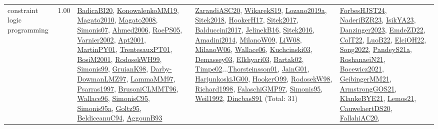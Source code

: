 {\begin{longtable}{p{3cm}r>{\raggedright\arraybackslash}p{6cm}>{\raggedright\arraybackslash}p{6cm}>{\raggedright\arraybackslash}p{8cm}}
\index{constraint logic programming}\index{CP!constraint logic programming}constraint logic programming &  1.00 & \hyperref[detail:BadicaBI20]{BadicaBI20}, \hyperref[detail:KonowalenkoMM19]{KonowalenkoMM19}, \hyperref[detail:Magato2010]{Magato2010}, \hyperref[detail:Magato2008]{Magato2008}, \hyperref[detail:Simonis07]{Simonis07}, \hyperref[detail:Ahmed2006]{Ahmed2006}, \hyperref[detail:RoePS05]{RoePS05}, \hyperref[detail:Varnier2002]{Varnier2002}, \hyperref[detail:Apt2001]{Apt2001}, \hyperref[detail:MartinPY01]{MartinPY01}, \hyperref[detail:TrentesauxPT01]{TrentesauxPT01}, \hyperref[detail:BosiM2001]{BosiM2001}, \hyperref[detail:RodosekWH99]{RodosekWH99}, \hyperref[detail:Simonis99]{Simonis99}, \hyperref[detail:GruianK98]{GruianK98}, \hyperref[detail:Darby-DowmanLMZ97]{Darby-DowmanLMZ97}, \hyperref[detail:LammaMM97]{LammaMM97}, \hyperref[detail:Psarras1997]{Psarras1997}, \hyperref[detail:BrusoniCLMMT96]{BrusoniCLMMT96}, \hyperref[detail:Wallace96]{Wallace96}, \hyperref[detail:SimonisC95]{SimonisC95}, \hyperref[detail:Simonis95a]{Simonis95a}, \hyperref[detail:Goltz95]{Goltz95}, \hyperref[detail:BeldiceanuC94]{BeldiceanuC94}, \hyperref[detail:AggounB93]{AggounB93} & \hyperref[detail:ZarandiASC20]{ZarandiASC20}, \hyperref[detail:WikarekS19]{WikarekS19}, \hyperref[detail:Lozano2019a]{Lozano2019a}, \hyperref[detail:Sitek2018]{Sitek2018}, \hyperref[detail:HookerH17]{HookerH17}, \hyperref[detail:Sitek2017]{Sitek2017}, \hyperref[detail:Balduccini2017]{Balduccini2017}, \hyperref[detail:JelinekB16]{JelinekB16}, \hyperref[detail:Sitek2016]{Sitek2016}, \hyperref[detail:Amadini2014]{Amadini2014}, \hyperref[detail:MilanoW09]{MilanoW09}, \hyperref[detail:LiW08]{LiW08}, \hyperref[detail:MilanoW06]{MilanoW06}, \hyperref[detail:Wallace06]{Wallace06}, \hyperref[detail:Kuchcinski03]{Kuchcinski03}, \hyperref[detail:Demassey03]{Demassey03}, \hyperref[detail:Elkhyari03]{Elkhyari03}, \hyperref[detail:Bartak02]{Bartak02}, \hyperref[detail:Timpe02]{Timpe02}...\hyperref[detail:Thorsteinsson01]{Thorsteinsson01}, \hyperref[detail:JainG01]{JainG01}, \hyperref[detail:HarjunkoskiJG00]{HarjunkoskiJG00}, \hyperref[detail:HookerO99]{HookerO99}, \hyperref[detail:RodosekW98]{RodosekW98}, \hyperref[detail:Richard1998]{Richard1998}, \hyperref[detail:FalaschiGMP97]{FalaschiGMP97}, \hyperref[detail:Simonis95]{Simonis95}, \hyperref[detail:Weil1992]{Weil1992}, \hyperref[detail:DincbasS91]{DincbasS91} (Total: 31) & \hyperref[detail:ForbesHJST24]{ForbesHJST24}, \hyperref[detail:NaderiBZR23]{NaderiBZR23}, \hyperref[detail:IsikYA23]{IsikYA23}, \hyperref[detail:Danzinger2023]{Danzinger2023}, \hyperref[detail:EmdeZD22]{EmdeZD22}, \hyperref[detail:ColT22]{ColT22}, \hyperref[detail:LuoB22]{LuoB22}, \hyperref[detail:ElciOH22]{ElciOH22}, \hyperref[detail:Song2022]{Song2022}, \hyperref[detail:PandeyS21a]{PandeyS21a}, \hyperref[detail:RoshanaeiN21]{RoshanaeiN21}, \hyperref[detail:Bocewicz2021]{Bocewicz2021}, \hyperref[detail:GeibingerMM21]{GeibingerMM21}, \hyperref[detail:ArmstrongGOS21]{ArmstrongGOS21}, \hyperref[detail:KlankeBYE21]{KlankeBYE21}, \hyperref[detail:Lemos21]{Lemos21}, \hyperref[detail:CauwelaertDS20]{CauwelaertDS20}, \hyperref[detail:FallahiAC20]{FallahiAC20}, 
\end{longtable}}
